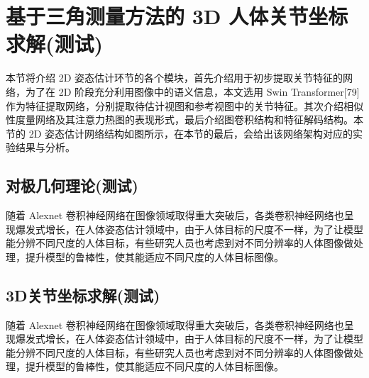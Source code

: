 \section{基于三角测量方法的 3D 人体关节坐标求解(测试)}
本节将介绍 2D 姿态估计环节的各个模块，首先介绍用于初步提取关节特征的网络，为了在 2D 阶段充分利用图像中的语义信息，本文选用 Swin Transformer[79]作为特征提取网络，分别提取待估计视图和参考视图中的关节特征。其次介绍相似性度量网络及其注意力热图的表现形式，最后介绍图卷积结构和特征解码结构。本节的 2D 姿态估计网络结构如图所示，在本节的最后，会给出该网络架构对应的实验结果与分析。

\subsection{对极几何理论(测试)}
随着 Alexnet 卷积神经网络在图像领域取得重大突破后，各类卷积神经网络也呈现爆发式增长，在人体姿态估计领域中，由于人体目标的尺度不一样，为了让模型能分辨不同尺度的人体目标，有些研究人员也考虑到对不同分辨率的人体图像做处理，提升模型的鲁棒性，使其能适应不同尺度的人体目标图像。

\subsection{3D关节坐标求解(测试)}
随着 Alexnet 卷积神经网络在图像领域取得重大突破后，各类卷积神经网络也呈现爆发式增长，在人体姿态估计领域中，由于人体目标的尺度不一样，为了让模型能分辨不同尺度的人体目标，有些研究人员也考虑到对不同分辨率的人体图像做处理，提升模型的鲁棒性，使其能适应不同尺度的人体目标图像。